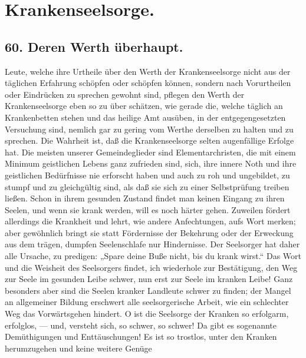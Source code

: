\section*{Krankenseelsorge.}

\subsection*{60. Deren Werth überhaupt.}

Leute, welche ihre Urtheile über den Werth der Krankenseelsorge nicht aus der täglichen Erfahrung schöpfen oder schöpfen können, sondern nach Vorurtheilen oder Eindrücken zu sprechen gewohnt sind, pflegen den Werth der Krankenseelsorge eben so zu über%
schätzen, wie gerade die, welche täglich an Krankenbetten stehen und das heilige Amt ausüben, in der entgegengesetzten Versuchung sind, nemlich gar zu gering vom Werthe derselben zu halten und zu sprechen. Die Wahrheit ist, daß die Krankenseelsorge selten augenfällige Erfolge hat. Die meisten unserer Gemeindeglieder sind Elementarchristen, die mit einem Minimum geistlichen Lebens ganz zufrieden sind, sich, ihre innere Noth und ihre geistlichen Bedürfnisse nie erforscht haben und auch zu roh und ungebildet, zu stumpf und zu gleichgültig sind, als daß sie sich zu einer Selbstprüfung treiben ließen. Schon in ihrem gesunden Zustand findet man keinen Eingang zu ihren Seelen, und wenn sie krank werden, will es noch härter gehen. Zuweilen fördert allerdings die Krankheit und lehrt, wie andere Anfechtungen, aufs Wort merken; aber gewöhnlich bringt sie statt Fördernisse der Bekehrung oder der Erweckung aus dem trägen, dumpfen Seelenschlafe nur Hindernisse. Der Seelsorger hat daher alle Ursache, zu predigen: „Spare deine Buße nicht, bis du krank wirst.“ Das Wort und die Weisheit des Seelsorgers findet, ich wiederhole zur Bestätigung, den Weg zur Seele im gesunden Leibe schwer, nun erst zur Seele im kranken Leibe! Ganz besonders aber sind die Seelen kranker Landleute schwer zu finden; der Mangel an allgemeiner Bildung erschwert alle seelsorgerische Arbeit, wie ein schlechter Weg das Vorwärtsgehen hindert. O ist die Seelsorge der Kranken so erfolgarm, erfolglos, — und, versteht sich, so schwer, so schwer! Da gibt es sogenannte Demüthigungen und Enttäuschungen! Es ist so trostlos, unter den Kranken herumzugehen und keine weitere Genüge
